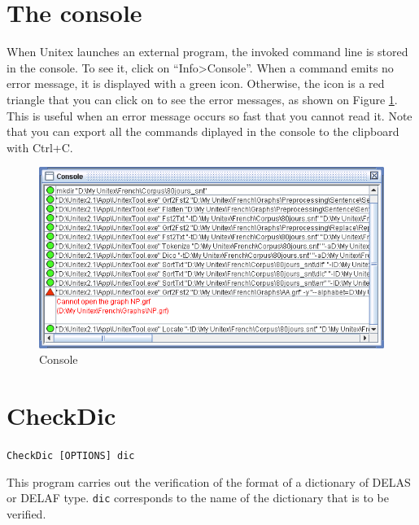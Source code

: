\section{The console}
\label{section-console}
When Unitex launches an external program, the invoked command line is stored in
the console. To see it, click on ``Info>Console''. When a command emits
no error message, it is displayed with a green icon. Otherwise, the icon is a red
triangle that you can click on to see the error messages, as shown on Figure
\ref{fig-console}. This is useful when an error message occurs so fast that you
cannot read it. Note that you can export all the commands diplayed in the
console to the clipboard with Ctrl+C.

\bigskip
\begin{figure}[!h]
\begin{center}
\includegraphics[width=15cm]{resources/img/fig11-2.png}
\caption{Console\label{fig-console}}
\end{center}
\end{figure}


\section{CheckDic}
\verb+CheckDic [OPTIONS] dic+

\bigskip
\noindent This program carries out the verification of the format of a dictionary
of DELAS or DELAF type. \verb+dic+ corresponds to the name
of the dictionary that is to be verified. 

